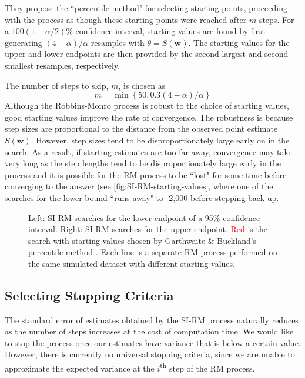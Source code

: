 They propose the ``percentile method" for selecting starting points, proceeding with the process as though these starting points were reached after $m$ steps. For a $100(1-\alpha/2)\%$ confidence interval, starting values are found by first generating $(4-\alpha)/\alpha$ resamples with $\theta = S(\bm{w})$. The starting values for the upper and lower endpoints are then provided by the second largest and second smallest resamples, respectively.

The number of steps to skip, $m$, is chosen as
\[
    m = \min \left\{ 50, 0.3(4-\alpha)/\alpha \right\}
\]
Although the Robbins-Monro process is robust to the choice of starting values, good starting values improve the rate of convergence. The robustness is because step sizes are proportional to the distance from the observed point estimate $S(\bm{w})$. However, step sizes tend to be disproportionately large early on in the search. As a result, if starting estimates are too far away, convergence may take very long as the step lengths tend to be disproportionately large early in the process and it is possible for the RM process to be ``lost" for some time before converging to the answer (see \autoref{fig:SI-RM-starting-values}, where one of the searches for the lower bound ``runs away" to -2{\small,}000 before stepping back up. 
\begin{figure}[ht]
    \centering
    
    \caption{Left: SI-RM searches for the lower endpoint of a 95\% confidence interval. Right: SI-RM searches for the upper endpoint. \textcolor{red}{Red} is the search with starting values chosen by Garthwaite \& Buckland's percentile method \cite{Garthwaite1992}. Each line is a separate RM process performed on the same simulated dataset with different starting values.}
    \label{fig:SI-RM-starting-values}
\end{figure}

\subsection{Selecting Stopping Criteria}\label{subsec:si-rm-stopping-criteria}

The standard error of estimates obtained by the SI-RM process naturally reduces as the number of steps increases at the cost of computation time. We would like to stop the process once our estimates have variance that is below a certain value. However, there is currently no universal stopping criteria, since we are unable to approximate the expected variance at the $i$\textsuperscript{th} step of the RM process. 

